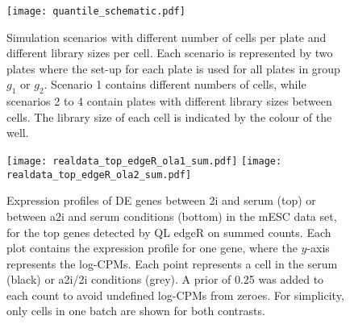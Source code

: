 \documentclass{article}
\begin{document}


\begin{figure}[p]
    \begin{center}
        \texttt{[image: quantile\_schematic.pdf]}
    \end{center}
    \caption{
        Simulation scenarios with different number of cells per plate and different library sizes per cell.
        Each scenario is represented by two plates where the set-up for each plate is used for all plates in group $g_1$ or $g_2$.
        Scenario 1 contains different numbers of cells, while scenarios 2 to 4 contain plates with different library sizes between cells.
        The library size of each cell is indicated by the colour of the well.
    }
    \label{fig:compsim}
\end{figure}

\begin{figure}[p]
    \begin{center}
        \texttt{[image: realdata\_top\_edgeR\_ola1\_sum.pdf]}
        \texttt{[image: realdata\_top\_edgeR\_ola2\_sum.pdf]}
    \end{center}
\caption{
    Expression profiles of DE genes between 2i and serum (top) or between a2i and serum conditions (bottom) in the mESC data set, 
        for the top genes detected by QL edgeR on summed counts.
    Each plot contains the expression profile for one gene, where the $y$-axis represents the log-CPMs.
    Each point represents a cell in the serum (black) or a2i/2i conditions (grey).
    A prior of 0.25 was added to each count to avoid undefined log-CPMs from zeroes.
    For simplicity, only cells in one batch are shown for both contrasts.
}
\label{fig:realdata}
\end{figure}



 
\end{document}
